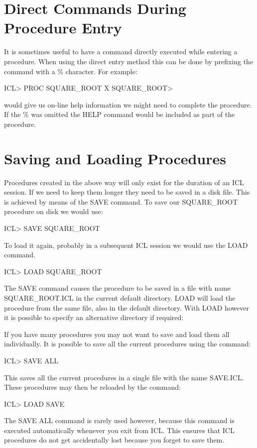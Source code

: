 \documentclass[twoside,11pt,nolof,chapters]{starlink}
\begin{document}
\section{Direct Commands During Procedure Entry}
It is sometimes useful to have a command directly executed while entering
a procedure. When using the direct entry method this can be done by
prefixing the command with a \% character. For example:
\begin{terminalv}
    ICL> PROC SQUARE_ROOT X
    SQUARE_ROOT> %
\end{terminalv}
would give us on-line help information we might need to complete the
procedure. If the \% was omitted the HELP command would be included as
part of the procedure.
\section{Saving and Loading Procedures}
Procedures created in the above way will only exist for the duration of
an ICL session. If we need to keep them longer they need to be saved in
a disk file. This is achieved by means of the SAVE command. To save our
SQUARE\_ROOT procedure on disk we would use:
\begin{terminalv}
    ICL> SAVE SQUARE_ROOT
\end{terminalv}
To load it again, probably in a subsequent ICL session we would use
the LOAD command.
\begin{terminalv}
    ICL> LOAD SQUARE_ROOT
\end{terminalv}
The SAVE command causes the procedure to be saved in a file with
name SQUARE\_ROOT.ICL in the current default directory. LOAD will load
the procedure from the same file, also in the default directory. With
LOAD however it is possible to specify an alternative directory if
required:
If you have many procedures you may not want to save and load them all
individually. It is possible to save all the current procedures using
the command:
\begin{terminalv}
    ICL> SAVE ALL
\end{terminalv}
This saves all the current procedures in a single file with the name SAVE.ICL.
These procedures may then be reloaded by the command:
\begin{terminalv}
    ICL> LOAD SAVE
\end{terminalv}
The SAVE ALL command is rarely used however, because this command is
executed automatically whenever you exit from ICL. This ensures that ICL
procedures do not get accidentally lost because you forget to save them.
\end{document}
